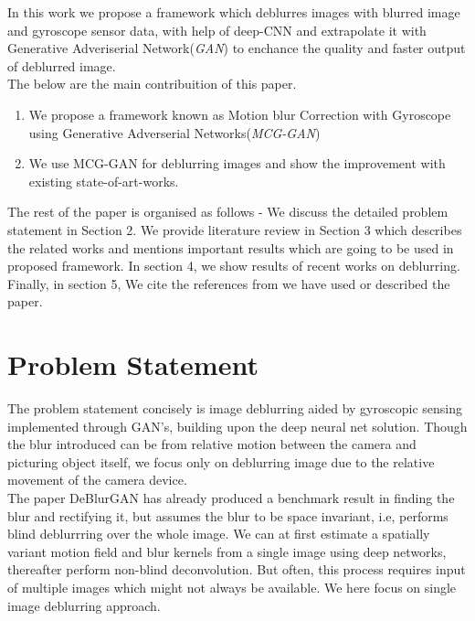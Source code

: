 \documentclass[10pt,twocolumn,letterpaper]{article}
\begin{document}
In this work we propose a framework which deblurres images with blurred image and gyroscope sensor data, with help of deep-CNN and extrapolate it with Generative Adveriserial Network(\textit{GAN}) to enchance the quality and faster output of deblurred image.\\
The below are the main contribuition of this paper.
\begin{enumerate}
	\item We propose a framework known as Motion blur Correction with Gyroscope using Generative Adverserial Networks(\textit{MCG-GAN})
	\item We use MCG-GAN for deblurring images and show the improvement with existing state-of-art-works.
\end{enumerate}
The rest of the paper is organised as follows - We discuss the detailed problem statement in Section 2. We provide literature review in Section 3 which describes the related works and mentions important results which are going to be used in proposed framework. In section 4, we show results of recent works on deblurring. Finally, in section 5, We cite the references from we have used or described the paper.
\section{Problem Statement}
\label{sec:problem}
The problem statement concisely is image deblurring aided by gyroscopic sensing implemented through GAN's, building upon the deep neural net solution. Though the blur introduced can be from relative motion between the camera and picturing object itself, we focus only on deblurring image due to the relative movement of the camera device.\\
The paper DeBlurGAN has already produced a benchmark result in finding the blur and rectifying it, but assumes the blur to be space invariant, i.e, performs blind deblurrring over the whole image. We can at first estimate a spatially variant motion field and blur kernels from a single image using deep networks, thereafter perform non-blind deconvolution. But often, this process requires input of multiple images which might not always be available. We here focus on single image deblurring approach. \\
\end{document}
